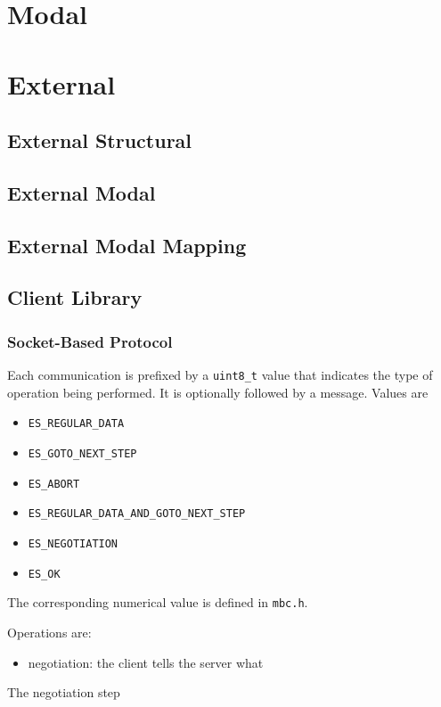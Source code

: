 \section{Modal}

\section{External}

\subsection{External Structural}

\subsection{External Modal}

\subsection{External Modal Mapping}

\subsection{Client Library}

\subsubsection{Socket-Based Protocol}
Each communication is prefixed by a \texttt{uint8\_t} value
that indicates the type of operation being performed.
It is optionally followed by a message.
Values are
\begin{itemize}
\item \texttt{ES\_REGULAR\_DATA}
\item \texttt{ES\_GOTO\_NEXT\_STEP}
\item \texttt{ES\_ABORT}
\item \texttt{ES\_REGULAR\_DATA\_AND\_GOTO\_NEXT\_STEP}
\item \texttt{ES\_NEGOTIATION}
\item \texttt{ES\_OK}
\end{itemize}
The corresponding numerical value is defined in \texttt{mbc.h}.

Operations are:
\begin{itemize}
\item negotiation: the client tells the server what
\end{itemize}

The negotiation step
